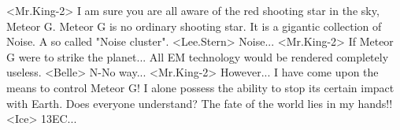 <Mr.King-2> I am sure you are all aware of the red shooting star in the sky, Meteor G. 
Meteor G is no ordinary shooting star. 
It is a gigantic collection of Noise. A so called "Noise cluster". 
<Lee.Stern> Noise... 
<Mr.King-2> If Meteor G were to strike the planet... 
All EM technology would be rendered completely useless. 
<Belle> N-No way... 
<Mr.King-2> However... I have come upon the means to control Meteor G! 
I alone possess the ability to stop its certain impact with Earth. 
Does everyone understand? 
The fate of the world lies in my hands!! 
<Ice> {13}{EC}... 
